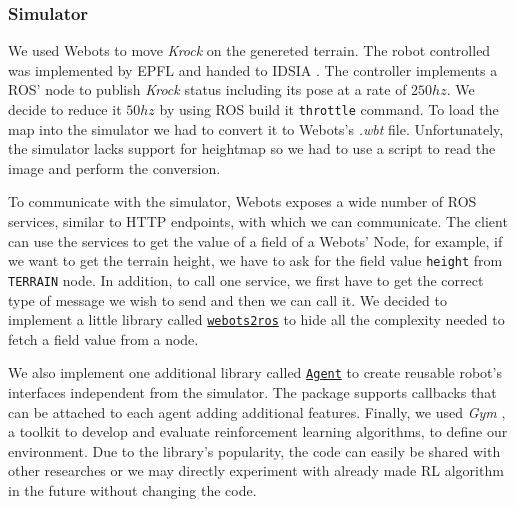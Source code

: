 \documentclass[../document.tex]{subfiles}
\begin{document}
\subsubsection{Simulator}
We used Webots to move \emph{Krock} on the genereted terrain. The robot controlled was implemented by EPFL  and handed to IDSIA . The controller implements a ROS' node to publish \emph{Krock} status including its pose at a rate of $250hz$. We decide to reduce it $50hz$ by using ROS build it \texttt{throttle} command. 
To load the map into the simulator we had to convert it to Webots's \emph{.wbt} file. Unfortunately, the simulator lacks support for heightmap so we had to use a script to read the image and perform the conversion.

To communicate with the simulator, Webots exposes a wide number of ROS services, similar to HTTP endpoints, with which we can communicate. The client can use the services to get the value of a field of a Webots' Node, for example, if we want to get the terrain height, we have to ask for the field value \texttt{height} from \texttt{TERRAIN} node. In addition, to call one service, we first have to get the correct type of message we wish to send and then we can call it. We decided to implement a little library called \href{https://github.com/FrancescoSaverioZuppichini/Master-Thesis/tree/master/core/utilities/webots2ros}{\texttt{webots2ros}} to hide all the complexity needed to fetch a field value from a node.

We also implement one additional library called \href{https://github.com/FrancescoSaverioZuppichini/Master-Thesis/tree/master/core/simulation/agent}{\texttt{Agent}} to create reusable robot's interfaces independent from the simulator. The package supports callbacks that can be attached to each agent adding additional features. Finally, we used \emph{Gym} \cite{gym}, a toolkit to develop and evaluate reinforcement learning algorithms, to define our environment. Due to the library's popularity,  the code can easily be shared with other researches or we may directly experiment with already made RL algorithm in the future without changing the code.
\end{document}

